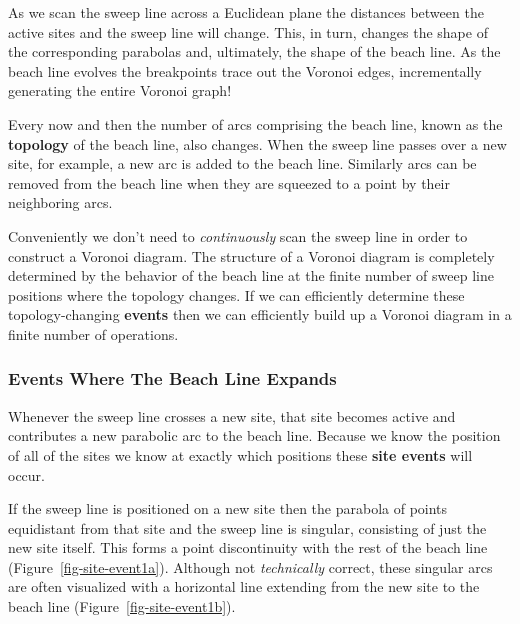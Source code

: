 \documentclass[
  letterpaper,
  DIV=11,
  numbers=noendperiod]{scrartcl}
\begin{document}
As we scan the sweep line across a Euclidean plane the distances between
the active sites and the sweep line will change. This, in turn, changes
the shape of the corresponding parabolas and, ultimately, the shape of
the beach line. As the beach line evolves the breakpoints trace out the
Voronoi edges, incrementally generating the entire Voronoi graph!

Every now and then the number of arcs comprising the beach line, known
as the \textbf{topology} of the beach line, also changes. When the sweep
line passes over a new site, for example, a new arc is added to the
beach line. Similarly arcs can be removed from the beach line when they
are squeezed to a point by their neighboring arcs.

Conveniently we don't need to \emph{continuously} scan the sweep line in
order to construct a Voronoi diagram. The structure of a Voronoi diagram
is completely determined by the behavior of the beach line at the finite
number of sweep line positions where the topology changes. If we can
efficiently determine these topology-changing \textbf{events} then we
can efficiently build up a Voronoi diagram in a finite number of
operations.

\subsubsection{Events Where The Beach Line
Expands}\label{events-where-the-beach-line-expands}

Whenever the sweep line crosses a new site, that site becomes active and
contributes a new parabolic arc to the beach line. Because we know the
position of all of the sites we know at exactly which positions these
\textbf{site events} will occur.

If the sweep line is positioned on a new site then the parabola of
points equidistant from that site and the sweep line is singular,
consisting of just the new site itself. This forms a point discontinuity
with the rest of the beach line (Figure~\ref{fig-site-event1a}).
Although not \emph{technically} correct, these singular arcs are often
visualized with a horizontal line extending from the new site to the
beach line (Figure~\ref{fig-site-event1b}).
\end{document}
